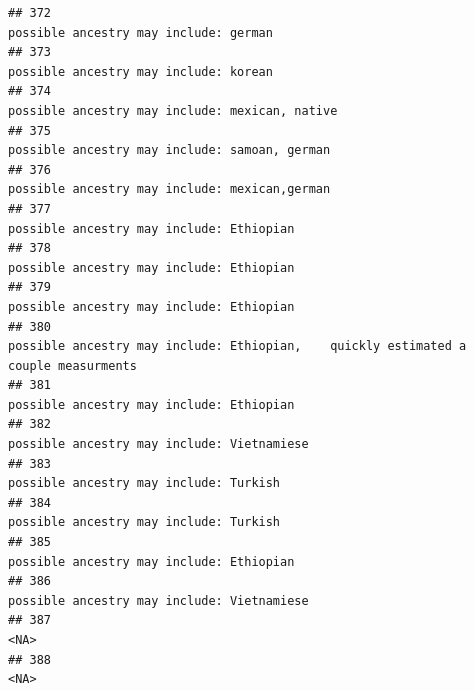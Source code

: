 \documentclass[]{article}
\begin{document}
\begin{verbatim}
## 372                                                                                                               possible ancestry may include: german
## 373                                                                                                               possible ancestry may include: korean
## 374                                                                                                      possible ancestry may include: mexican, native
## 375                                                                                                       possible ancestry may include: samoan, german
## 376                                                                                                       possible ancestry may include: mexican,german
## 377                                                                                                            possible ancestry may include: Ethiopian
## 378                                                                                                            possible ancestry may include: Ethiopian
## 379                                                                                                            possible ancestry may include: Ethiopian
## 380                                                                 possible ancestry may include: Ethiopian,    quickly estimated a couple measurments
## 381                                                                                                            possible ancestry may include: Ethiopian
## 382                                                                                                          possible ancestry may include: Vietnamiese
## 383                                                                                                              possible ancestry may include: Turkish
## 384                                                                                                              possible ancestry may include: Turkish
## 385                                                                                                            possible ancestry may include: Ethiopian
## 386                                                                                                          possible ancestry may include: Vietnamiese
## 387                                                                                                                                                <NA>
## 388                                                                                                                                                <NA>

\end{verbatim}
\end{document}
